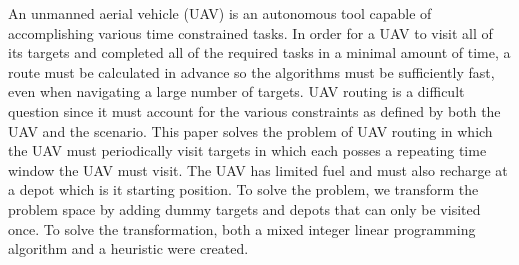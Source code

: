 An unmanned aerial vehicle (UAV) is an autonomous tool capable of accomplishing various time constrained tasks. In order for a UAV to visit all of its targets and completed all of the required tasks in a minimal amount of time, a route must be calculated in advance so the algorithms must be sufficiently fast, even when navigating a large number of targets. UAV routing is a difficult question since it must account for the various constraints as defined by both the UAV and the scenario. This paper solves the problem of UAV routing in which the UAV must periodically visit targets in which each posses a repeating time window the UAV must visit. The UAV has limited fuel and must also recharge at a depot which is it starting position.  To solve the problem, we transform the problem space by adding dummy targets and depots that can only be visited once. To solve the transformation, both a mixed integer linear programming algorithm and a heuristic were created.  